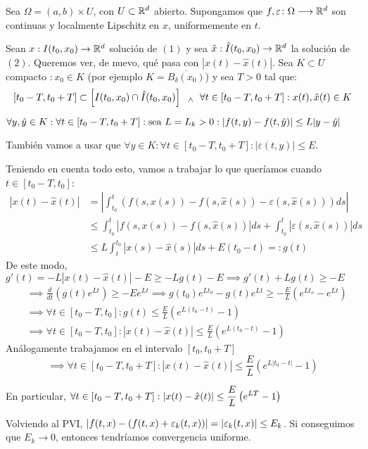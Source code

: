 Sea $\Omega = (a,b) \times U$, con  $U \subset \mathbb{R}^d$ abierto. Supongamos que $f, \varepsilon \colon \Omega \longrightarrow \mathbb{R}^d$ son continuas y localmente Lipschitz en $x$, uniformemente en $t$.

Sean $x: I (t_0,x_0) \to \mathbb{R}^d$ solución de $(1)$ y sea $\hat{x}: \hat{I}(t_0,x_0)\to \mathbb{R}^d$ la solución de $(2)$. Queremos ver, de nuevo, qué pasa con $|x(t)-\hat{x}(t)|$. Sea $K \subset U$ compacto $ : x_0 \in K$ (por ejemplo $K = \overline{B_\delta (x_0)}$) y sea $T>0$ tal que:
\[[t_0-T,t_0+T] \subset \left[ I(t_0,x_0) \cap \hat{I} (t_0,x_0) \right] \,\, \; _{\wedge} \; \,\, \forall t \in [t_0-T,t_0+T] : x(t), \hat{x}(t) \in K\]

$\forall y, \hat{y} \in K : \forall t \in [t_0-T,t_0+T] :\text{sea } L=L_k > 0 : |f(t,y)-f(t,\hat{y}) | \leq L |y-\hat{y}|$

También vamos a usar que $\forall y \in K : \forall t \in [t_0-T,t_0+T] : |\varepsilon(t,y) | \leq E$.

Teniendo en cuenta todo esto, vamos a trabajar lo que queríamos cuando $t \in [t_0-T, t_0]$:
\[\begin{aligned}
		|x(t)-\hat{x}(t)| & = \left | \int_{t_0}^t (f(s,x(s))-f(s,\hat{x}(s))-\varepsilon(s,\hat{x}(s))) ds \right |       \\
		                  & \leq \int_{t_0}^t |f(s,x(s))-f(s,\hat{x}(s))| ds + \int_{t_0}^t |\varepsilon(s,\hat{x}(s))| ds \\
		                  & \leq L \int_t^{t_0} |x(s)-\hat{x}(s)| ds + E(t_0-t) =: g(t)
	\end{aligned}\]
De este modo, $g'(t) = -L |x(t)-\hat{x}(t)| - E \geq -Lg(t) - E \implies g'(t)+Lg(t)\geq - E$
\[\begin{aligned}
		 & \implies \frac{d}{dt} \left ( g(t) e^{Lt} \right ) \geq -E e^{Lt} \implies g(t_0) e^{Lt_0} - g(t)e^{Lt} \geq - \frac{E}{L} \left( e^{Lt_o} - e^{Lt} \right) \\
		 & \implies \forall t \in [t_0-T,t_0] : g(t)\leq \frac{E}{L}\left ( e^{L(t_0-t)}-1\right )                                                                     \\
		 & \implies \forall t \in [t_0-T,t_0] : |x(t)-\hat{x}(t)| \leq \frac{E}{L}  \left ( e^{L(t_0-t)}-1 \right )
	\end{aligned}\]
Análogamente trabajamos en el intervalo $[t_0,t_0+T]$
\[\implies \forall t \in [t_0-T,t_0+T] : \boxed{|x(t)-\hat{x}(t)| \leq \frac{E}{L}  \left ( e^{L|t_0-t|}-1 \right )}\]

En particular, $\displaystyle \forall t \in [t_0-T,t_0+T] : |x(t)-\hat{x}(t)| \leq \frac{E}{L}\left (e^{LT} - 1 \right )$

Volviendo al PVI, $\displaystyle |f(t,x)-(f(t,x)+\varepsilon_k(t,x))| = |\varepsilon_k (t,x)| \leq E_k$. Si conseguimos que $E_k \to 0$, entonces tendríamos convergencia uniforme.
